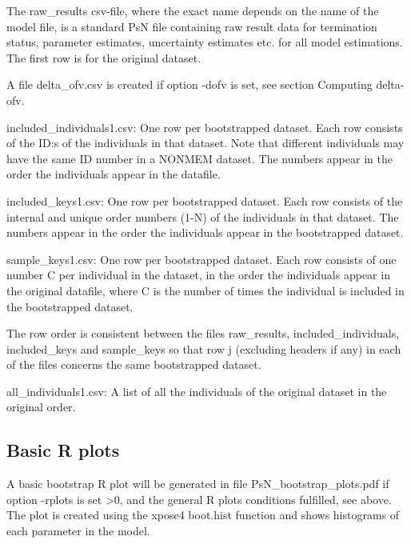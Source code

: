 The raw\_results csv-file, where the exact name depends on the name of the model file, 
is a standard PsN file containing raw result data for termination status, parameter estimates, uncertainty estimates etc. for all model estimations. 
The first row is for the original dataset.

A file delta\_ofv.csv is created if option -dofv is set, see section Computing delta-ofv.

included\_individuals1.csv: One row per bootstrapped dataset. Each row consists of the ID:s of the individuals in that dataset. Note that different individuals may have the same ID number in a NONMEM dataset. The numbers appear in the order the individuals appear in the datafile.

included\_keys1.csv: One row per bootstrapped dataset. Each row consists of the internal and unique order numbers (1-N) of the individuals in that dataset. The numbers appear in the order the individuals appear in the bootstrapped dataset. 

sample\_keys1.csv:  One row per bootstrapped dataset. Each row consists of one number C per individual in the dataset, in the order the individuals appear in the original datafile, where C is the number of times the individual is included in the bootstrapped dataset. 

The row order is consistent between the files raw\_results, included\_individuals, included\_keys and sample\_keys so that row j (excluding headers if any) in each of the files concerns the same bootstrapped dataset.

all\_individuals1.csv: A list of all the individuals of the original dataset in the original order.

\subsection{Basic R plots}
A basic bootstrap R plot will be generated in file PsN\_bootstrap\_plots.pdf
if option -rplots is set >0, and the general R plots conditions fulfilled, see above.
The plot is created using the xpose4 boot.hist function
and shows histograms of each parameter in the model.

